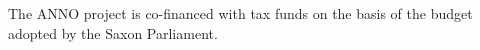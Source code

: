 \documentclass[sw]{iosart2x}
\begin{document}


\begin{ack}
The ANNO project is co-financed with tax funds on the basis of the budget adopted by the Saxon Parliament.
\end{ack}

\nocite{*}


\end{document}
